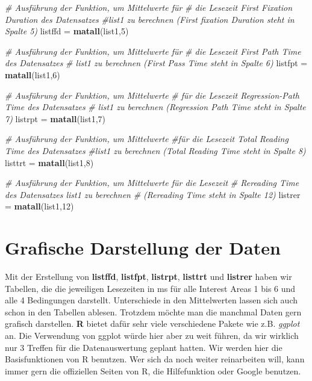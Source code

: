 \documentclass[]{book}
\newenvironment{Shaded}{\begin{snugshade}}{\end{snugshade}}
\newcommand{\KeywordTok}[1]{\textcolor[rgb]{0.13,0.29,0.53}{\textbf{#1}}}
\newcommand{\DecValTok}[1]{\textcolor[rgb]{0.00,0.00,0.81}{#1}}
\newcommand{\StringTok}[1]{\textcolor[rgb]{0.31,0.60,0.02}{#1}}
\newcommand{\CommentTok}[1]{\textcolor[rgb]{0.56,0.35,0.01}{\textit{#1}}}
\newcommand{\NormalTok}[1]{#1}
\begin{document}
\begin{Shaded}
\begin{Highlighting}[]
\CommentTok{# Ausführung der Funktion, um Mittelwerte für }
\CommentTok{# die Lesezeit First Fixation Duration des Datensatzes}
\CommentTok{#list1 zu berechnen (First fixation Duration steht in Spalte 5)}
\NormalTok{listffd =}\StringTok{ }\KeywordTok{matall}\NormalTok{(list1,}\DecValTok{5}\NormalTok{)}

\CommentTok{# Ausführung der Funktion, um Mittelwerte für }
\CommentTok{# die Lesezeit First Path Time des Datensatzes }
\CommentTok{# list1 zu berechnen (First Pass Time steht in Spalte 6)}
\NormalTok{listfpt =}\StringTok{ }\KeywordTok{matall}\NormalTok{(list1,}\DecValTok{6}\NormalTok{)}

\CommentTok{# Ausführung der Funktion, um Mittelwerte }
\CommentTok{# für die Lesezeit Regression-Path Time des Datensatzes}
\CommentTok{# list1 zu berechnen (Regression Path Time steht in Spalte 7)}
\NormalTok{listrpt =}\StringTok{ }\KeywordTok{matall}\NormalTok{(list1,}\DecValTok{7}\NormalTok{)}

\CommentTok{# Ausführung der Funktion, um Mittelwerte }
\CommentTok{#für die Lesezeit Total Reading Time des Datensatzes}
\CommentTok{#list1 zu berechnen (Total Reading Time steht in Spalte 8)}
\NormalTok{listtrt =}\StringTok{ }\KeywordTok{matall}\NormalTok{(list1,}\DecValTok{8}\NormalTok{)}

\CommentTok{# Ausführung der Funktion, um Mittelwerte für die Lesezeit}
\CommentTok{# Rereading Time des Datensatzes list1 zu berechnen }
\CommentTok{# (Rereading Time steht in Spalte 12)}
\NormalTok{listrer =}\StringTok{ }\KeywordTok{matall}\NormalTok{(list1,}\DecValTok{12}\NormalTok{)}
\end{Highlighting}
\end{Shaded}

\chapter{Grafische Darstellung der
Daten}\label{grafische-darstellung-der-daten}

Mit der Erstellung von \textbf{listffd}, \textbf{listfpt},
\textbf{listrpt}, \textbf{listtrt} und \textbf{listrer} haben wir
Tabellen, die die jeweiligen Lesezeiten in ms für alle Interest Areas 1
bis 6 und alle 4 Bedingungen darstellt. Unterschiede in den Mittelwerten
lassen sich auch schon in den Tabellen ablesen. Trotzdem möchte man die
manchmal Daten gern grafisch darstellen. \textbf{R} bietet dafür sehr
viele verschiedene Pakete wie z.B. \emph{ggplot} an. Die Verwendung von
ggplot würde hier aber zu weit führen, da wir wirklich nur 3 Treffen für
die Datenauswertung geplant hatten. Wir werden hier die Basisfunktionen
von R benutzen. Wer sich da noch weiter reinarbeiten will, kann immer
gern die offiziellen Seiten von R, die Hilfefunktion oder Google
benutzen.
\end{document}
